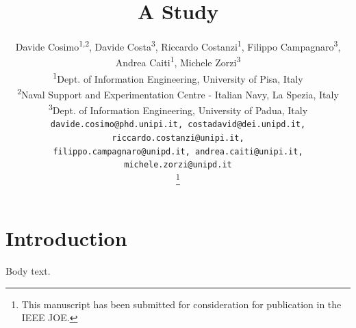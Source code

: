 \documentclass[12pt,onecolumn]{IEEEtran}
\begin{document}
\title{A Study}
\author{
Davide Cosimo\textsuperscript{1,2}, Davide Costa\textsuperscript{3}, Riccardo Costanzi\textsuperscript{1},
Filippo Campagnaro\textsuperscript{3}, \\
Andrea Caiti\textsuperscript{1}, Michele Zorzi\textsuperscript{3} \\[1em]

\textsuperscript{1}Dept. of Information Engineering, University of Pisa, Italy \\
\textsuperscript{2}Naval Support and Experimentation Centre - Italian Navy, La Spezia, Italy \\
\textsuperscript{3}Dept. of Information Engineering, University of Padua, Italy \\[1em]

\texttt{davide.cosimo@phd.unipi.it, costadavid@dei.unipd.it, riccardo.costanzi@unipi.it,}\\
\texttt{filippo.campagnaro@unipd.it, andrea.caiti@unipi.it, michele.zorzi@unipd.it}

\thanks{This manuscript has been submitted for consideration for publication in the IEEE JOE.}
}
\maketitle
\section{Introduction}
Body text.
\end{document}
